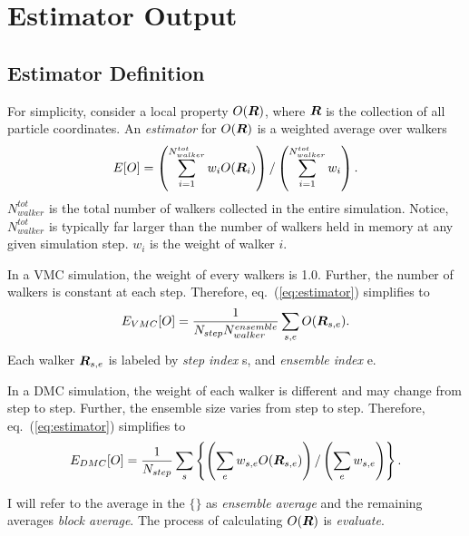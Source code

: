 \section{Estimator Output}
\subsection{Estimator Definition}
For simplicity, consider a local property $O(\boldsymbol{R})$, where $\boldsymbol{R}$ is the collection of all particle coordinates. An \textit{estimator} for $O(\boldsymbol{R}) $ is a weighted average over walkers
\begin{align}
E[O] = \left(\sum\limits_{i=1}^{N^{tot}_{walker}} w_i O(\boldsymbol{R}_i) \right) / \left( \sum \limits_{i=1}^{N^{tot}_{walker}} w_i \right). \label{eq:estimator}
\end{align}
$N^{tot}_{walker}$ is the total number of walkers collected in the entire simulation. Notice, $N^{tot}_{walker}$ is typically far larger than the number of walkers held in memory at any given simulation step. $w_i$ is the weight of walker $i$.

In a VMC simulation, the weight of every walkers is 1.0. Further, the number of walkers is constant at each step. Therefore, eq.~(\ref{eq:estimator}) simplifies to
\begin{align}
E_{VMC}[O] = \frac{1}{N_{step}N_{walker}^{ensemble}} \sum_{s,e} O(\boldsymbol{R}_{s,e}).
\end{align}
Each walker $\boldsymbol{R}_{s,e}$ is labeled by \textit{step index} s, and \textit{ensemble index} e.

In a DMC simulation, the weight of each walker is different and may change from step to step. Further, the ensemble size varies from step to step. Therefore, eq.~(\ref{eq:estimator}) simplifies to
\begin{align}
E_{DMC}[O] = \frac{1}{N_{step}} \sum_{s} \left\{ \left(\sum_e w_{s,e} O(\boldsymbol{R}_{s,e})  \right) / \left( \sum \limits_{e} w_{s,e} \right)  \right\}.
\end{align}

I will refer to the average in the $\{\}$ as \textit{ensemble average} and the remaining averages \textit{block average}. The process of calculating $O(\boldsymbol{R})$ is \textit{evaluate}.

